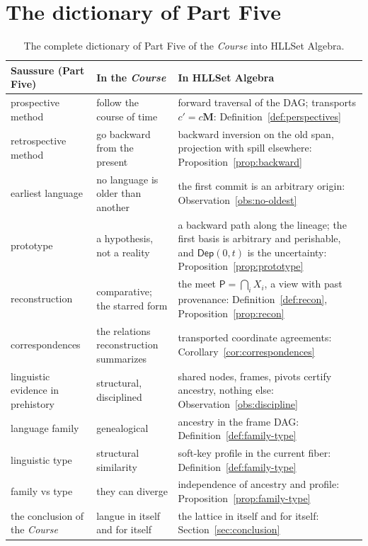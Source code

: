 \documentclass[11pt,a4paper]{article}
\theoremstyle{remark}
\newcommand{\Dep}{\ensuremath{\mathsf{Dep}}}             %
\newcommand{\Change}{\ensuremath{\mathbf{M}}}            %
\newcommand{\Proto}{\ensuremath{\mathsf{P}}}             %
\begin{document}
\FloatBarrier
\section{The dictionary of Part Five}
\label{sec:dictionary}

\begin{table}[htbp]
\centering
\renewcommand{\arraystretch}{1.2}
\begin{tabular}{@{}>{\raggedright\arraybackslash}p{3.4cm}
                    >{\raggedright\arraybackslash}p{4.2cm}
                    >{\raggedright\arraybackslash}p{7.0cm}@{}}
\toprule
Saussure (Part Five) & In the \textit{Course} & In HLLSet Algebra \\
\midrule
prospective method & follow the course of time & forward traversal of the
DAG; transports $c' = c\Change$: Definition~\ref{def:perspectives} \\
retrospective method & go backward from the present & backward inversion on
the old span, projection with spill elsewhere:
Proposition~\ref{prop:backward} \\
earliest language & no language is older than another & the first commit is
an arbitrary origin: Observation~\ref{obs:no-oldest} \\
prototype & a hypothesis, not a reality & a backward path along the lineage;
the first basis is arbitrary and perishable, and $\Dep(0,t)$ is the
uncertainty: Proposition~\ref{prop:prototype} \\
reconstruction & comparative; the starred form & the meet
$\Proto = \bigcap_i X_i$, a view with past provenance:
Definition~\ref{def:recon}, Proposition~\ref{prop:recon} \\
correspondences & the relations reconstruction summarizes & transported
coordinate agreements: Corollary~\ref{cor:correspondences} \\
linguistic evidence in prehistory & structural, disciplined & shared nodes,
frames, pivots certify ancestry, nothing else:
Observation~\ref{obs:discipline} \\
language family & genealogical & ancestry in the frame DAG:
Definition~\ref{def:family-type} \\
linguistic type & structural similarity & soft-key profile in the current
fiber: Definition~\ref{def:family-type} \\
family vs type & they can diverge & independence of ancestry and profile:
Proposition~\ref{prop:family-type} \\
the conclusion of the \textit{Course} & langue in itself and for itself & the
lattice in itself and for itself: Section~\ref{sec:conclusion} \\
\bottomrule
\end{tabular}
\caption{The complete dictionary of Part Five of the \textit{Course} into
HLLSet Algebra.}
\label{tab:dictionary}
\end{table}
\end{document}
